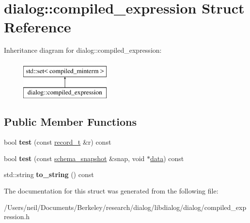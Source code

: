 \hypertarget{structdialog_1_1compiled__expression}{}\section{dialog\+:\+:compiled\+\_\+expression Struct Reference}
\label{structdialog_1_1compiled__expression}
Inheritance diagram for dialog\+:\+:compiled\+\_\+expression\+:\begin{figure}[H]
\begin{center}
\leavevmode
\includegraphics[height=2.000000cm]{structdialog_1_1compiled__expression}
\end{center}
\end{figure}
\subsection*{Public Member Functions}
\begin{DoxyCompactItemize}
\item 
\mbox{\label{structdialog_1_1compiled__expression_a1fd26bfda42b0d13436f1eb9312b9db2}} 
bool {\bfseries test} (const \hyperlink{structdialog_1_1record__t}{record\+\_\+t} \&r) const
\item 
\mbox{\label{structdialog_1_1compiled__expression_a45a50c874a5c3b439d03b1f1addf9829}} 
bool {\bfseries test} (const \hyperlink{classdialog_1_1schema__snapshot}{schema\+\_\+snapshot} \&snap, void $\ast$\hyperlink{structdialog_1_1data}{data}) const
\item 
\mbox{\label{structdialog_1_1compiled__expression_ae4160ae052c56fcf76ad65ad5a4135ee}} 
std\+::string {\bfseries to\+\_\+string} () const
\end{DoxyCompactItemize}


The documentation for this struct was generated from the following file\+:\begin{DoxyCompactItemize}
\item 
/\+Users/neil/\+Documents/\+Berkeley/research/dialog/libdialog/dialog/compiled\+\_\+expression.\+h\end{DoxyCompactItemize}
